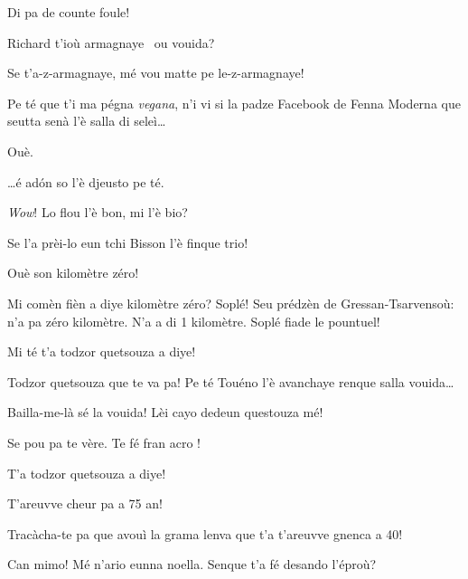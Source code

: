 \begin{drama}
\Spritzspeaks{} Di pa de counte foule!


\Saventaspeaks{} Richard t'ioù armagnaye \albicocca\ ou vouida?

\Richardspeaks Se t'a-z-armagnaye, mé vou matte pe le-z-armagnaye!


\Saventaspeaks{} Pe té que t'i ma pégna \textit{vegana}, n'i vi si la padze Facebook de Fenna Moderna que seutta senà l'è salla di seleì\ldots

\Gerominespeaks Ouè.

\Saventaspeaks \ldots é ad\'on so l'è djeusto pe té.


\Gerominespeaks \textit{Wow}!  Lo flou l'è bon, mi l'è bio?

\Tuenospeaks Se l'a prèi-lo eun tchi Bisson l'è finque trio!

\Saventaspeaks Ouè son kilomètre zéro!

\Richardspeaks Mi comèn fièn a diye kilomètre zéro? Soplé! Seu pré\-dzèn de Gressan-Tsarvensoù: n'a pa zéro kilomètre. N'a a di 1 kilomètre. Soplé fiade le pountuel!

\Tuenospeaks{} Mi té t'a todzor quetsouza a diye! 

\Saventaspeaks{} Todzor quetsouza que te va pa!  Pe té Touéno l’è avanchaye renque salla vouida\ldots

\Tuenospeaks Bailla-me-là sé la vouida! Lèi cayo dedeun questouza mé!



\Richardspeaks{} Se pou pa te vère. Te fé fran acro \digouto !

\Tuenospeaks T'a todzor quetsouza a diye!

\Richardspeaks T'areuvve cheur pa a 75 an!

\Tuenospeaks Tracàcha-te pa que avouì la grama lenva que t'a t'areuvve gnenca a 40!

\scene[-- Si pe Comboé]

\Saventaspeaks Can mimo! Mé n'ario eunna noella.  Senque t'a fé desando l'éproù?


\end{drama}
